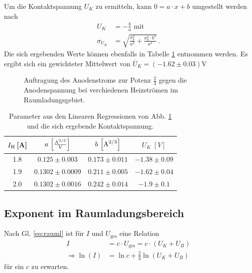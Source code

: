 \documentclass[12pt,a4paper,titlepage,headinclude,bibtotoc]{scrartcl}
\begin{document}
Um die Kontaktspannung $U_K$ zu ermitteln, kann $0=a\cdot x + b$ umgestellt werden nach 
\begin{align*}
U_K &= -\frac{b}{a} \text{ mit}\\
\sigma_{U_K} &= \sqrt{\frac{\sigma_b^2}{a^2}+\frac{\sigma_a^2 \cdot b^2}{a^4}}\, .
\end{align*}
Die sich ergebenden Werte können ebenfalls in Tabelle \ref{tab:ParaRaum} entnommen werden.
Es ergibt sich ein gewichteter Mittelwert von $\overline U_K=(-1.62 \pm 0.03)\si\volt$\\

\begin{figure}[h]
   \centering
   \hfill
   \hfill
   \caption{Auftragung des Anodenstroms zur Potenz $\frac{2}{3}$ gegen die Anodenspannung bei verchiedenen Heizströmen im Raumladungsgebiet.}
   \label{fig:raumladung}
 \end{figure}

\begin{table}[!h]
\centering
\begin{tabular}{|c||c|c|c|}
\hline
$I_\text H\,$[A]& $a\,\left[\frac{\text A^{2/3}}{\text V}\right]$	& $b\,\left[\text A^{2/3}\right]$ & $U_K \; [V]$	\\\hline\hline
1.8 		& $0.125\pm 0.003$	& $0.173\pm 0.011$		&$-1.38 \pm 0.09$	\\\hline
1.9 		& $0.1302\pm0.0009$ 	& $0.211\pm 0.005$		&$-1.62 \pm 0.04$	\\\hline
2.0 		& $0.1302\pm 0.0016$	& $0.242 \pm 0.014$		&$-1.9 \pm 0.1	$	\\\hline
\end{tabular}
\caption{Parameter aus den Linearen Regressionen von Abb. \ref{fig:raumladung} und die sich ergebende Kontaktspannung.}
\label{tab:ParaRaum}
\end{table}

\subsection{Exponent im Raumladungsbereich}
Nach Gl. \eqref{eq:rauml} ist für $I$ und $U_\text{ges}$ eine Relation
\begin{align}
I &= c\cdot U_\text{ges} = c\cdot \left( U_K+U_B \right)\\
\Rightarrow \ln (I) &= \ln c + \frac{2}{3} \ln \left( U_K + U_B \right)
\end{align}
für ein $c$ zu erwarten.
\end{document}

